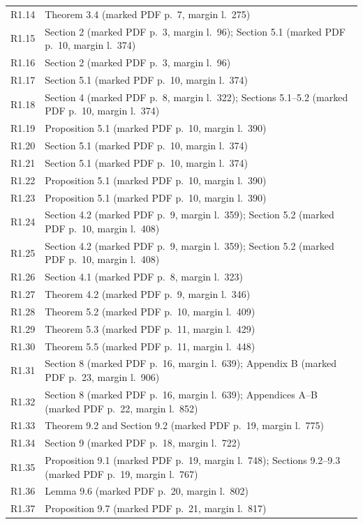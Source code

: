 \documentclass[
  10pt,
  a4paper,
]{article}
\begin{document}
\begin{longtable}{@{}p{}p{}@{}}
R1.14 & Theorem 3.4 (marked PDF p.~7, margin l.~275)\\
R1.15 & Section 2 (marked PDF p.~3, margin l.~96); Section 5.1 (marked PDF p.~10, margin l.~374)\\
R1.16 & Section 2 (marked PDF p.~3, margin l.~96)\\
R1.17 & Section 5.1 (marked PDF p.~10, margin l.~374)\\
R1.18 & Section 4 (marked PDF p.~8, margin l.~322); Sections 5.1--5.2 (marked PDF p.~10, margin l.~374)\\
R1.19 & Proposition 5.1 (marked PDF p.~10, margin l.~390)\\
R1.20 & Section 5.1 (marked PDF p.~10, margin l.~374)\\
R1.21 & Section 5.1 (marked PDF p.~10, margin l.~374)\\
R1.22 & Proposition 5.1 (marked PDF p.~10, margin l.~390)\\
R1.23 & Proposition 5.1 (marked PDF p.~10, margin l.~390)\\
R1.24 & Section 4.2 (marked PDF p.~9, margin l.~359); Section 5.2 (marked PDF p.~10, margin l.~408)\\
R1.25 & Section 4.2 (marked PDF p.~9, margin l.~359); Section 5.2 (marked PDF p.~10, margin l.~408)\\
R1.26 & Section 4.1 (marked PDF p.~8, margin l.~323)\\
R1.27 & Theorem 4.2 (marked PDF p.~9, margin l.~346)\\
R1.28 & Theorem 5.2 (marked PDF p.~10, margin l.~409)\\
R1.29 & Theorem 5.3 (marked PDF p.~11, margin l.~429)\\
R1.30 & Theorem 5.5 (marked PDF p.~11, margin l.~448)\\
R1.31 & Section 8 (marked PDF p.~16, margin l.~639); Appendix B (marked PDF p.~23, margin l.~906)\\
R1.32 & Section 8 (marked PDF p.~16, margin l.~639); Appendices A--B (marked PDF p.~22, margin l.~852)\\
R1.33 & Theorem 9.2 and Section 9.2 (marked PDF p.~19, margin l.~775)\\
R1.34 & Section 9 (marked PDF p.~18, margin l.~722)\\
R1.35 & Proposition 9.1 (marked PDF p.~19, margin l.~748); Sections 9.2--9.3 (marked PDF p.~19, margin l.~767)\\
R1.36 & Lemma 9.6 (marked PDF p.~20, margin l.~802)\\
R1.37 & Proposition 9.7 (marked PDF p.~21, margin l.~817)\\

\end{longtable}
\end{document}

